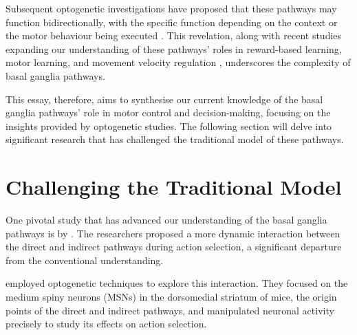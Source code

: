 \documentclass[10pt]{article}
\begin{document}
\begin{sloppypar}
  Subsequent optogenetic investigations have proposed that these pathways may function bidirectionally, with the specific function depending on the context or the motor behaviour being executed \citep{yttri_opponent_2016}. This revelation, along with recent studies expanding our understanding of these pathways’ roles in reward-based learning, motor learning, and movement velocity regulation \citep{hilt_evidence_2016, wang_direct_2015}, underscores the complexity of basal ganglia pathways.

  This essay, therefore, aims to synthesise our current knowledge of the basal ganglia pathways’ role in motor control and decision-making, focusing on the insights provided by optogenetic studies. The following section will delve into significant research that has challenged the traditional model of these pathways.

  \section{Challenging the Traditional Model}
  \label{sec:challenging-the-traditional-model}

  One pivotal study that has advanced our understanding of the basal ganglia pathways is by \cite{cui_concurrent_2013}. The researchers proposed a more dynamic interaction between the direct and indirect pathways during action selection, a significant departure from the conventional understanding.

  \cite{cui_concurrent_2013} employed optogenetic techniques to explore this interaction. They focused on the medium spiny neurons (MSNs) in the dorsomedial striatum of mice, the origin points of the direct and indirect pathways, and manipulated neuronal activity precisely to study its effects on action selection.


\end{sloppypar}
\end{document}
